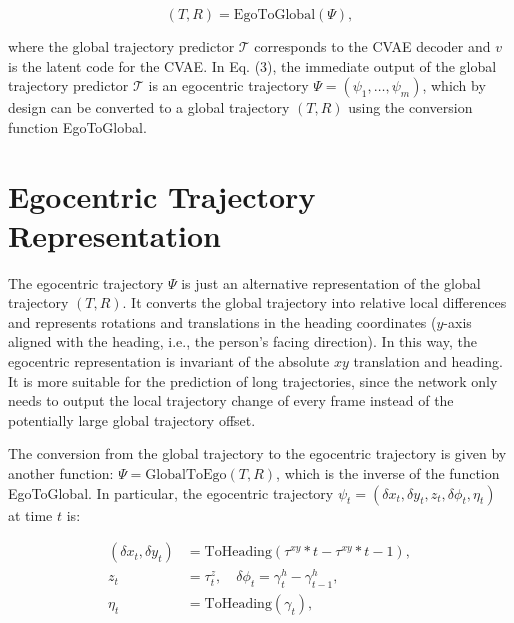 \begin{equation}
(T, R) = \text{EgoToGlobal}(\Psi), \tag{4}
\end{equation}

where the global trajectory predictor $\mathcal{T}$ corresponds to the CVAE decoder and $v$ is the latent code for the CVAE. In Eq. (3), the immediate output of the global trajectory predictor $\mathcal{T}$ is an egocentric trajectory $\Psi = (\psi_1,\ldots,\psi_m)$, which by design can be converted to a global trajectory $(T, R)$ using the conversion function EgoToGlobal.

\section*{Egocentric Trajectory Representation}
The egocentric trajectory $\Psi$ is just an alternative representation of the global trajectory $(T, R)$. It converts the global trajectory into relative local differences and represents rotations and translations in the heading coordinates ($y$-axis aligned with the heading, i.e., the person's facing direction). In this way, the egocentric representation is invariant of the absolute $xy$ translation and heading. It is more suitable for the prediction of long trajectories, since the network only needs to output the local trajectory change of every frame instead of the potentially large global trajectory offset.

The conversion from the global trajectory to the egocentric trajectory is given by another function: $\Psi = \text{GlobalToEgo}(T, R)$, which is the inverse of the function EgoToGlobal. In particular, the egocentric trajectory $\psi_t = (\delta x_t, \delta y_t, z_t, \delta\phi_t, \eta_t)$ at time $t$ is:

\begin{align}
(\delta x_t, \delta y_t) &= \text{ToHeading}(\tau^{xy}*t - \tau^{xy}*{t-1}), \tag{5} \\
z_t &= \tau^z_t, \quad \delta\phi_t = \gamma^h_t - \gamma^h_{t-1}, \tag{6} \\
\eta_t &= \text{ToHeading}(\gamma_t), \tag{7}
\end{align}

